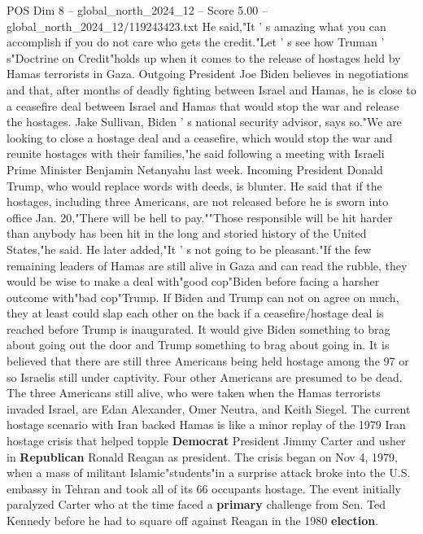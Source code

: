 \begin{textsample}{POS Dim 8 – global\_north\_2024\_12 – Score 5.00 – global\_north\_2024\_12/119243423.txt}  \label{ex:f8_pos_345}
He said,"It ' s amazing what you can accomplish if you do not care who gets the credit."Let ' s see how Truman ' s"Doctrine on Credit"holds up when it comes to the release of hostages held by Hamas terrorists in Gaza.
Outgoing President Joe Biden believes in negotiations and that, after months of deadly fighting between Israel and Hamas, he is close to a ceasefire deal between Israel and Hamas that would stop the war and release the hostages.
Jake Sullivan, Biden ' s national security advisor, says so."We are looking to close a hostage deal and a ceasefire, which would stop the war and reunite hostages with their families,"he said following a meeting with Israeli Prime Minister Benjamin Netanyahu last week.
Incoming President Donald Trump, who would replace words with deeds, is blunter.
He said that if the hostages, including three Americans, are not released before he is sworn into office Jan. 20,"There will be hell to pay.""Those responsible will be hit harder than anybody has been hit in the long and storied history of the United States,"he said.
He later added,"It ' s not going to be pleasant."If the few remaining leaders of Hamas are still alive in Gaza and can read the rubble, they would be wise to make a deal with"good cop"Biden before facing a harsher outcome with"bad cop"Trump.
If Biden and Trump can not on agree on much, they at least could slap each other on the back if a ceasefire/hostage deal is reached before Trump is inaugurated.
It would give Biden something to brag about going out the door and Trump something to brag about going in.
It is believed that there are still three Americans being held hostage among the 97 or so Israelis still under captivity.
Four other Americans are presumed to be dead.
The three Americans still alive, who were taken when the Hamas terrorists invaded Israel, are Edan Alexander, Omer Neutra, and Keith Siegel.
The current hostage scenario with Iran backed Hamas is like a minor replay of the 1979 Iran hostage crisis that helped topple \textbf{Democrat} President Jimmy Carter and usher in \textbf{Republican} Ronald Reagan as president.
The crisis began on Nov 4, 1979, when a mass of militant Islamic"students"in a surprise attack broke into the U.S. embassy in Tehran and took all of its 66 occupants hostage.
The event initially paralyzed Carter who at the time faced a \textbf{primary} challenge from Sen.
Ted Kennedy before he had to square off against Reagan in the 1980 \textbf{election}.

\end{textsample}
